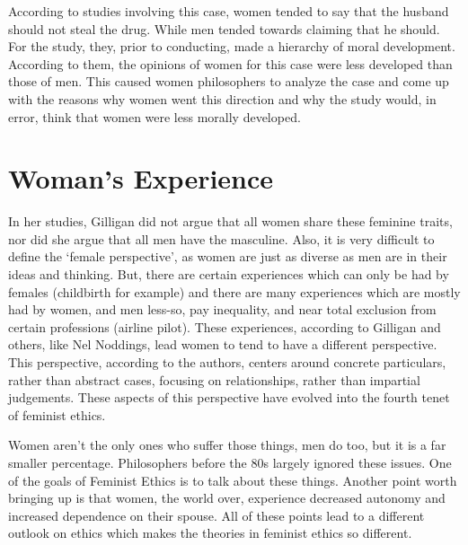 
According to studies involving this case, women tended to say that the husband should not steal the drug. While men tended towards claiming that he should. For the study, they, prior to conducting, made a hierarchy of moral development. According to them, the opinions of women for this case were less developed than those of men. This caused women philosophers to analyze the case and come up with the reasons why women went this direction and why the study would, in error, think that women were less morally developed.

\section{Woman's Experience}

In her studies, Gilligan did not argue that all women share these feminine traits, nor did she argue that all men have the masculine. Also, it is very difficult to define the ‘female perspective’, as women are just as diverse as men are in their ideas and thinking. But, there are certain experiences which can only be had by females (childbirth for example) and there are many experiences which are mostly had by women, and men less-so, pay inequality, and near total exclusion from certain professions (airline pilot). These experiences, according to Gilligan and others, like Nel Noddings, lead women to tend to have a different perspective. This perspective, according to the authors, centers around concrete particulars, rather than abstract cases, focusing on relationships, rather than impartial judgements. These aspects of this perspective have evolved into the fourth tenet of feminist ethics.

Women aren’t the only ones who suffer those things, men do too, but it is a far smaller percentage. Philosophers before the 80s largely ignored these issues. One of the goals of Feminist Ethics is to talk about these things. Another point worth bringing up is that women, the world over, experience decreased autonomy and increased dependence on their spouse. All of these points lead to a different outlook on ethics which makes the theories in feminist ethics so different.
